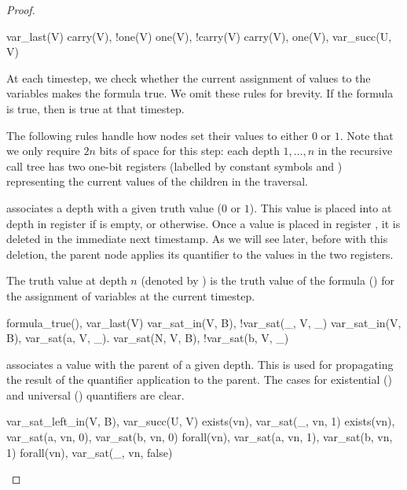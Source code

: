 \begin{proof}
\begin{Drules}
        {var_last(V)}
        {carry(V), !one(V)}
        {one(V), !carry(V)}
        {carry(V), one(V), var_succ(U, V)}
\end{Drules}

At each timestep, we check whether the current assignment of values to the variables makes the formula true.  We omit these rules for brevity.  If the formula is true, then  is true at that timestep.

The following rules handle how nodes set their values to either $0$ or $1$.  Note that we only require $2n$ bits of space for this step: each depth $1,\ldots,n$ in the recursive call tree has two one-bit registers (labelled by constant symbols  and ) representing the current values of the children in the traversal.

 associates a depth with a given truth value ($0$ or $1$).  This value is placed into  at depth  in register  if  is empty, or  otherwise.  Once a value is placed in register , it is deleted in the immediate next timestamp.  As we will see later, before with this deletion, the parent node applies its quantifier to the values in the two registers.

The truth value at depth $n$ (denoted by ) is the truth value of the formula () for the assignment of variables at the current timestep.

\begin{Drules}
        {formula_true(), var_last(V)}
        {var_sat_in(V, B), !var_sat(_, V, _)}
        {var_sat_in(V, B), var_sat(a, V, _).}
        {var_sat(N, V, B), !var_sat(b, V, _)}
\end{Drules}

 associates a value with the parent of a given depth.  This is used for propagating the result of the quantifier application to the parent.  The cases for existential () and universal () quantifiers are clear.

\begin{Drules}
        {var_sat_left_in(V, B), var_succ(U, V)}
        {exists(vn), var_sat(_, vn, 1)}
        {exists(vn), var_sat(a, vn, 0), var_sat(b, vn, 0)}
        {forall(vn), var_sat(a, vn, 1), var_sat(b, vn, 1)}
        {forall(vn), var_sat(_, vn, false)}
\end{Drules}


\end{proof}
